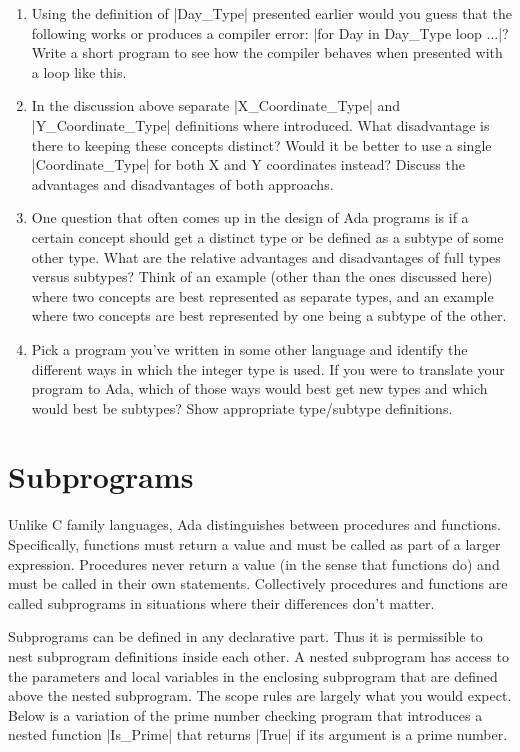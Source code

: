 \begin{enumerate}
\item Using the definition of |Day_Type| presented earlier would you guess that the following
  works or produces a compiler error: |for Day in Day_Type loop ...|? Write a short program to
  see how the compiler behaves when presented with a loop like this.

\item In the discussion above separate |X_Coordinate_Type| and |Y_Coordinate_Type| definitions
  where introduced. What disadvantage is there to keeping these concepts distinct? Would it be
  better to use a single |Coordinate_Type| for both X and Y coordinates instead? Discuss the
  advantages and disadvantages of both approachs.

\item One question that often comes up in the design of Ada programs is if a certain concept
  should get a distinct type or be defined as a subtype of some other type. What are the
  relative advantages and disadvantages of full types versus subtypes? Think of an example
  (other than the ones discussed here) where two concepts are best represented as separate
  types, and an example where two concepts are best represented by one being a subtype of the
  other.

\item Pick a program you've written in some other language and identify the different ways in
  which the integer type is used. If you were to translate your program to Ada, which of those
  ways would best get new types and which would best be subtypes? Show appropriate type/subtype
  definitions.
\end{enumerate}

\section{Subprograms}

Unlike C family languages, Ada distinguishes between procedures and functions. Specifically,
functions must return a value and must be called as part of a larger expression. Procedures
never return a value (in the sense that functions do) and must be called in their own
statements. Collectively procedures and functions are called subprograms in situations where
their differences don't matter.

Subprograms can be defined in any declarative part. Thus it is permissible to nest subprogram
definitions inside each other. A nested subprogram has access to the parameters and local
variables in the enclosing subprogram that are defined above the nested subprogram. The scope
rules are largely what you would expect. Below is a variation of the prime number checking
program that introduces a nested function |Is_Prime| that returns |True| if its argument is a
prime number.

